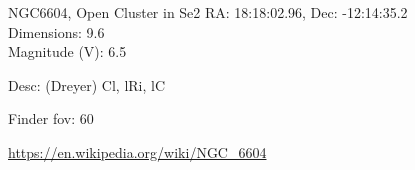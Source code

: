 \begin{block}{NGC6604, Open Cluster in Se2}
    RA: 18:18:02.96, Dec: -12:14:35.2 \\ 
    Dimensions: 9.6 \\ 
    Magnitude (V): 6.5


    Desc: (Dreyer) Cl, lRi, lC 

    Finder fov: 60 

    \url{https://en.wikipedia.org/wiki/NGC_6604} 
\end{block}